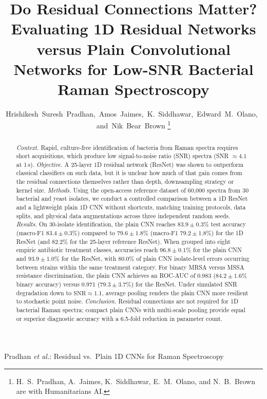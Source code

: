 \documentclass[journal,onecolumn]{IEEEtran}
\newcommand{\sunit}[1]{#1\,s}             %
\begin{document}
\title{Do Residual Connections Matter? Evaluating 1D Residual Networks
versus Plain Convolutional Networks for Low-SNR Bacterial Raman Spectroscopy}

\author{Hrishikesh~Suresh~Pradhan,~Amos~Jaimes,~K.~Siddhawar,~Edward~M.~Olano,~and~Nik~Bear~Brown%
\thanks{H.~S.~Pradhan, A.~Jaimes, K.~Siddhawar, E.~M.~Olano, and N.~B.~Brown are with Humanitarians AI.}}

%
{Pradhan \MakeLowercase{\textit{et al.}}: Residual vs.\ Plain 1D CNNs for Raman Spectroscopy}

\maketitle

\begin{abstract}
\emph{Context.} Rapid, culture-free identification of bacteria from Raman
spectra requires short acquisitions, which produce low signal-to-noise
ratio (SNR) spectra (SNR $\approx 4.1$ at \sunit{1}).
\emph{Objective.} A 25-layer 1D residual network (ResNet) was shown to
outperform classical classifiers on such data, but it is unclear how much
of that gain comes from the residual connections themselves rather than
depth, downsampling strategy or kernel size.
\emph{Methods.} Using the open-access reference dataset of 60{,}000
spectra from 30 bacterial and yeast isolates, we conduct a controlled
comparison between a 1D ResNet and a lightweight plain 1D CNN without
shortcuts, matching training protocols, data splits, and physical data
augmentations across three independent random seeds.
\emph{Results.} On 30-isolate identification, the plain CNN reaches
$83.9 \pm 0.3\%$ test accuracy (macro-F1 $83.4 \pm 0.3\%$) compared to
$79.6 \pm 1.8\%$ (macro-F1 $79.2 \pm 1.8\%$) for the 1D ResNet (and 82.2\%
for the 25-layer reference ResNet). When grouped into eight empiric
antibiotic treatment classes, accuracies reach $96.8 \pm 0.1\%$ for the plain CNN
and $93.9 \pm 1.0\%$ for the ResNet, with $80.0\%$ of plain CNN isolate-level
errors occurring between strains within the same treatment category. For binary
MRSA versus MSSA resistance discrimination, the plain CNN achieves an ROC-AUC
of 0.983 ($84.2 \pm 1.6\%$ binary accuracy) versus 0.971 ($79.3 \pm 3.7\%$)
for the ResNet. Under simulated SNR degradation down to $\mathrm{SNR}\approx 1.1$,
average pooling renders the plain CNN more resilient to stochastic point noise.
\emph{Conclusion.} Residual connections are not required for 1D bacterial
Raman spectra; compact plain CNNs with multi-scale pooling provide equal or
superior diagnostic accuracy with a 6.5-fold reduction in parameter count.
\end{abstract}
\end{document}
